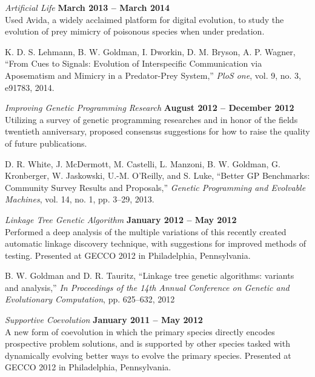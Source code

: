 \documentclass[margin,line]{resume}
\begin{document}
\begin{resume}
    \textsl{Artificial Life} \hfill \textbf{March 2013 -- March 2014}\\
    Used Avida, a widely acclaimed platform for digital evolution, to study the evolution
    of prey mimicry of poisonous species when under predation.

    \vspace{-2mm}
    K. D. S. Lehmann,  B. W. Goldman, I. Dworkin, D. M. Bryson, A. P. Wagner,
    ``From Cues to Signals: Evolution of Interspecific Communication via Aposematism and Mimicry in a Predator-Prey System,''
    \textsl{PloS one}, vol. 9, no. 3, e91783, 2014.    

    \pagebreak
    
    \textsl{Improving Genetic Programming Research} \hfill \textbf{August 2012 -- December 2012}\\
    Utilizing a survey of genetic programming researches and in honor of the fields twentieth anniversary,
    proposed consensus suggestions for how to raise the quality of future publications.

    \vspace{-2mm}
    D. R. White, J. McDermott, M. Castelli, L. Manzoni, B. W. Goldman,
    G. Kronberger, W. Jaskowski, U.-M. O’Reilly, and S. Luke,
    ``Better GP Benchmarks: Community Survey Results and Proposals,''
    \textsl{Genetic Programming and Evolvable Machines}, vol. 14, no. 1, pp. 3--29, 2013.    

    \textsl{Linkage Tree Genetic Algorithm} \hfill \textbf{January 2012 -- May 2012}\\
    Performed a deep analysis of the multiple variations of this recently created automatic linkage
    discovery technique, with suggestions for improved methods of testing. Presented at GECCO 2012 in Philadelphia, Pennsylvania.

    \vspace{-2mm}
    B. W. Goldman and D. R. Tauritz,
    ``Linkage tree genetic algorithms: variants and analysis,''
    \textsl{In Proceedings of the 14th Annual Conference on Genetic and Evolutionary Computation}, pp. 625--632, 2012

    \textsl{Supportive Coevolution} \hfill \textbf{January 2011 -- May 2012}\\
    A new form of coevolution in which the primary species directly encodes prospective problem solutions,
    and is supported by other species tasked with dynamically evolving better ways to evolve the primary species.
    Presented at GECCO 2012 in Philadelphia, Pennsylvania.
    

\end{resume}
\end{document}

